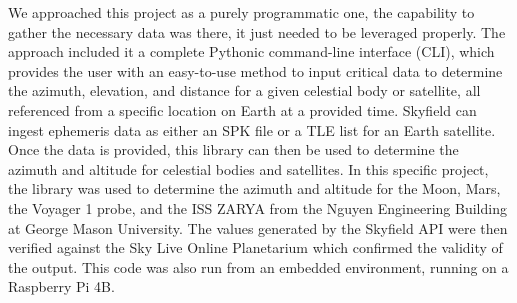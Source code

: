 \documentclass[../main.tex]{subfiles}
\begin{document}
We approached this project as a purely programmatic one, the capability to gather the necessary data was there, it just needed to be leveraged properly. The approach included it a complete Pythonic command-line interface (CLI), which provides the user with an easy-to-use method to input critical data to determine the azimuth, elevation, and distance for a given celestial body or satellite, all referenced from a specific location on Earth at a provided time. Skyfield can ingest ephemeris data as either an SPK file or a TLE list for an Earth satellite. Once the data is provided, this library can then be used to determine the azimuth and altitude for celestial bodies and satellites. In this specific project, the library was used to determine the azimuth and altitude for the Moon, Mars, the Voyager 1 probe, and the ISS ZARYA from the Nguyen Engineering Building at George Mason University. The values generated by the Skyfield API were then verified against the Sky Live Online Planetarium which confirmed the validity of the output. This code was also run from an embedded environment, running on a Raspberry Pi 4B.
\end{document}
